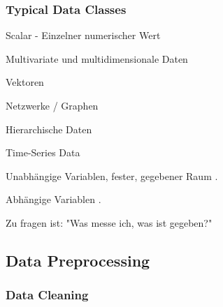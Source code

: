 \documentclass[10pt]{article} %
\begin{document}
\subsubsection{Typical Data Classes}

\begin{cptitemize} 
      \item Scalar - Einzelner numerischer Wert
      \item Multivariate und multidimensionale Daten 
      \item Vektoren 
      \item Netzwerke / Graphen 
      \item Hierarchische Daten 
      \item Time-Series Data 
\end{cptitemize} 

\begin{definition} 
 	  \begin{cptitemize} 
 	  	\item \textbf{} Unabhängige Variablen, fester, gegebener Raum .
 	   	 \item \textbf{} Abhängige Variablen .
 	  \end{cptitemize} 
 	  Zu fragen ist: "Was messe ich, was ist gegeben?"
\end{definition} 

\subsection{Data Preprocessing}

\subsubsection{Data Cleaning}
\label{sec:data-cleaning}
\end{document}
